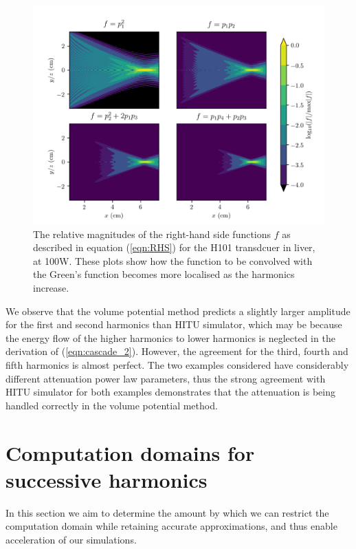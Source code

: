 \documentclass[11pt]{article}
\numberwithin{equation}{section}
\newcommand{\red}[1]{{\color{black} #1}}
\begin{document}
\begin{figure}[ht!]
    \centering
    \includegraphics[width=0.95\linewidth]{Figure7}
    \caption{The relative magnitudes of the right-hand side functions 
    $f$ as described in equation (\ref{eqn:RHS}) for the H101 transdcuer in liver,
    at 100W. These plots show how the function to be convolved with the 
    Green's function becomes more localised as the harmonics increase.}
    \label{fig:relative_magnitudes_H101}
\end{figure} 
We observe that the volume potential method predicts a slightly larger amplitude 
for the first and second harmonics than HITU simulator, \red{which may be because the energy 
flow of the higher harmonics to lower harmonics is neglected in the derivation of 
(\ref{eqn:cascade_2}).} However, the agreement for the third, fourth and 
fifth harmonics is almost perfect. The two examples considered have 
considerably different attenuation power law parameters, thus the strong 
agreement with HITU simulator for both examples demonstrates that the attenuation 
is being handled correctly in the volume potential method.
 
\section{Computation domains for successive harmonics}
\label{sec:results}
In this section we aim to 
determine the amount by which we can restrict the computation domain while 
retaining accurate approximations, and thus enable acceleration of our simulations. 
\end{document}
